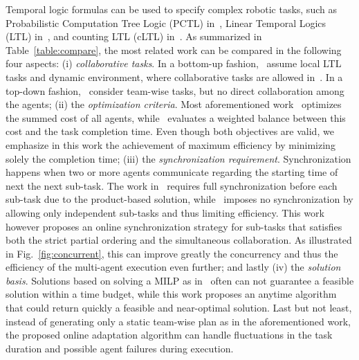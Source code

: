 Temporal logic formulas can be used to specify complex robotic tasks,
such as Probabilistic Computation Tree Logic (PCTL) in~\citep{lahijanian2011temporal},
Linear Temporal Logics (LTL) in~\citep{kantaros2020stylus, schillinger2018simultaneous,
 guo2015multi, chen2011formal},
and counting LTL (cLTL) in~\citep{sahin2019multirobot}.
As summarized in Table~\ref{table:compare},
the most related work can be compared in the following four aspects:
(i) \emph{collaborative tasks}.
In a bottom-up fashion,~\citep{guo2015multi, tumova2016multi, guo2016task} assume local LTL tasks and dynamic environment,
where collaborative tasks are allowed in~\citep{guo2016task}.
In a top-down fashion,~\citep{kantaros2020stylus, schillinger2018simultaneous, luo2021temporal, sahin2019multirobot, jones2019scratchs} consider team-wise tasks,
but no direct collaboration among the agents;
(ii) the \emph{optimization criteria}.
Most aforementioned work~\citep{kantaros2020stylus, guo2016task, luo2021temporal, sahin2019multirobot, jones2019scratchs} optimizes
the summed cost of all agents,
while~\citep{schillinger2018simultaneous} evaluates a weighted balance between this cost and
the task completion time.
Even though both objectives are valid,
we emphasize in this work the achievement of maximum efficiency by minimizing solely the completion time;
(iii) the \emph{synchronization requirement}.
Synchronization happens when two or more agents communicate regarding the starting time of next the next sub-task.
The work in~\citep{kantaros2020stylus, luo2021abstraction, sahin2019multirobot} requires
full synchronization before each sub-task due to the product-based solution,
while~\citep{schillinger2018simultaneous} imposes no synchronization by allowing
only independent sub-tasks and thus limiting efficiency.
This work however proposes an online synchronization strategy for sub-tasks
that satisfies both the strict partial ordering and the simultaneous collaboration.
As illustrated in Fig.~\ref{fig:concurrent},
this can improve greatly the concurrency and thus the efficiency of the multi-agent execution even further;
and lastly
(iv) the \emph{solution basis}.
Solutions based on solving a MILP as in~\citep{luo2021temporal, sahin2019multirobot, jones2019scratchs} often can not guarantee a feasible solution within a time budget,
while this work proposes an anytime algorithm that could return quickly a feasible
and near-optimal solution.
Last but not least,
instead of generating only a static team-wise plan as in the aforementioned work,
the proposed online adaptation algorithm can handle fluctuations in the task duration
and possible agent failures during execution.

